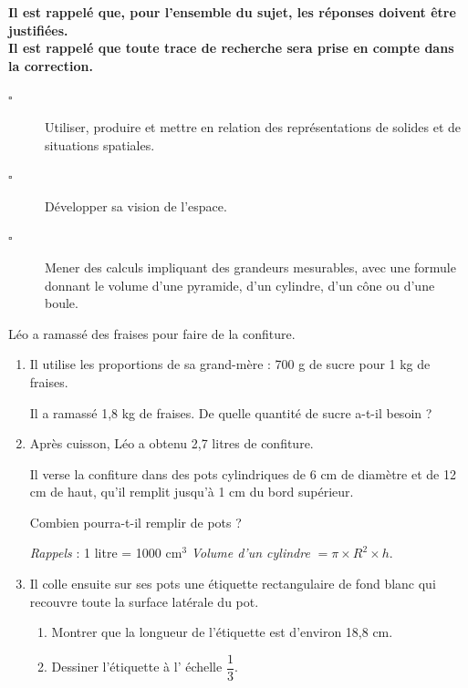 \documentclass[openany]{book}
\begin{document}
\medskip

\textbf{Il est rappelé que, pour l'ensemble du sujet, les réponses doivent être justifiées.\\
Il est rappelé que toute trace de recherche sera prise en compte dans la
correction.}





\begin{seance}

\begin{description}
\item[$\square$]  Utiliser, produire et mettre en relation des représentations de solides et de situations
spatiales.
\item[$\square$] Développer sa vision de l’espace.
\item[$\square$] Mener des calculs impliquant des grandeurs mesurables, avec une formule donnant le volume d’une pyramide, d’un cylindre, d’un cône ou d’une boule.
\end{description}
\end{seance}



\Dnb



Léo a ramassé des fraises pour faire de la confiture.

\medskip

\begin{enumerate}
\item Il utilise les proportions de sa grand-mère : 700 g de sucre pour 1 kg de fraises.

Il a ramassé 1,8 kg de fraises. De quelle quantité de sucre a-t-il besoin ?
\item  Après cuisson, Léo a obtenu 2,7 litres de confiture.

Il verse la confiture dans des pots cylindriques de 6 cm de diamètre et de
12 cm de haut, qu'il remplit jusqu'à 1 cm du bord supérieur.

Combien pourra-t-il remplir de pots ?

\emph{Rappels} : 1 litre = 1000 cm$^3$ \quad 
\emph{Volume d'un cylindre}  $= \pi \times R^2 \times h$.
\item  Il colle ensuite sur ses pots une étiquette rectangulaire de fond blanc qui recouvre toute la surface latérale du pot.
	\begin{enumerate}
		\item Montrer que la longueur de l'étiquette est d'environ 18,8 cm.
		\item Dessiner l'étiquette à l' échelle $\dfrac{1}{3}$.
	\end{enumerate} 
 \end{enumerate}
\end{document}
